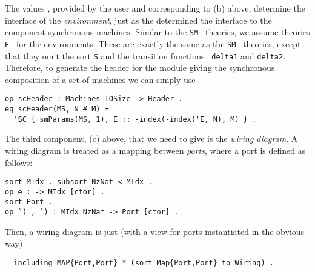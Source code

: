 \documentclass[copyright,creativecommons]{eptcs}
\begin{document}
The values , provided by the user and corresponding to (b) above,
determine the interface of the \emph{environment}, just as the 
determined the interface to the component synchronous machines.  Similar to the
{\tt SM--} theories, we assume theories {\tt E--} for the
environments. These are exactly the same as the {\tt SM--} theories,
except that they omit the sort {\tt S} and the transition functions {\tt
delta1} and {\tt delta2}. Therefore, to generate the header for the module
giving the synchronous composition of a set of machines we can simply use

\begin{center}
\begin{small}
\begin{boxedminipage}{0.80\textwidth}
\begin{verbatim}
op scHeader : Machines IOSize -> Header .
eq scHeader(MS, N # M) = 
  'SC { smParams(MS, 1), E :: -index(-index('E, N), M) } .
\end{verbatim}
\end{boxedminipage}
\end{small}
\end{center}

The third component, (c) above, that we need to give is the \emph{wiring
diagram}. A wiring diagram is treated as a mapping between \emph{ports}, where
a port is defined as follows:

\begin{center}
\begin{small}
\begin{boxedminipage}{0.50\textwidth}
\begin{verbatim}
sort MIdx . subsort NzNat < MIdx . 
op e : -> MIdx [ctor] . 
sort Port . 
op `(_,_`) : MIdx NzNat -> Port [ctor] .
\end{verbatim}
\end{boxedminipage}
\end{small}
\end{center}

\noindent
Then, a wiring diagram is just (with a view for ports instantiated in the obvious way)

\begin{center}
\begin{small}
\begin{boxedminipage}{0.75\textwidth}
\begin{verbatim}
  including MAP{Port,Port} * (sort Map{Port,Port} to Wiring) .
\end{verbatim}
\end{boxedminipage}
\end{small}
\end{center}
\end{document}
